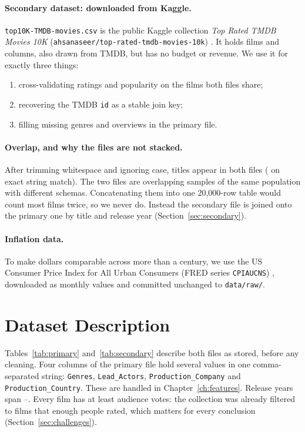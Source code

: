 \documentclass[a4paper,12pt]{report}
\newcommand{\code}[1]{\texttt{#1}}
\begin{document}
\paragraph{Secondary dataset: downloaded from Kaggle.} \code{top10K-TMDB-movies.csv} is the public Kaggle collection \emph{Top Rated TMDB Movies 10K} (\code{ahsanaseer/top-rated-tmdb-movies-10k}) \cite{kaggle}. It holds \AuditSecondaryRows{} films and \AuditSecondaryCols{} columns, also drawn from TMDB, but has no budget or revenue. We use it for exactly three things:
\begin{enumerate}
  \item cross-validating ratings and popularity on the films both files share;
  \item recovering the TMDB \code{id} as a stable join key;
  \item filling missing genres and overviews in the primary file.
\end{enumerate}

\paragraph{Overlap, and why the files are not stacked.} After trimming whitespace and ignoring case, \AuditTitleOverlapNormalised{} titles appear in both files (\AuditTitleOverlapExact{} on exact string match). The two files are overlapping samples of the same population with different schemas. Concatenating them into one 20{,}000-row table would count most films twice, so we never do. Instead the secondary file is joined onto the primary one by title and release year (Section~\ref{sec:secondary}).

\paragraph{Inflation data.} To make dollars comparable across more than a century, we use the US Consumer Price Index for All Urban Consumers (FRED series \code{CPIAUCNS}) \cite{fred}, downloaded as monthly values and committed unchanged to \code{data/raw/}.

\section{Dataset Description}

Tables~\ref{tab:primary} and~\ref{tab:secondary} describe both files as stored, before any cleaning. Four columns of the primary file hold several values in one comma-separated string: \code{Genres}, \code{Lead\_Actors}, \code{Production\_Company} and \code{Production\_Country}. These are handled in Chapter~\ref{ch:features}. Release years span \AuditYearMin{}--\AuditYearMax{}. Every film has at least \AuditTotalVotesMin{} audience votes: the collection was already filtered to films that enough people rated, which matters for every conclusion (Section~\ref{sec:challenges}).
\end{document}
